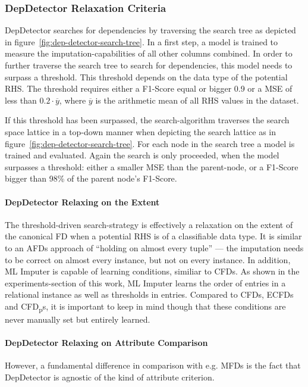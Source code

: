 \subsubsection{DepDetector Relaxation Criteria}
DepDetector searches for dependencies by traversing the search tree as depicted in figure~\ref{fig:dep-detector-search-tree}.
In a first step, a model is trained to measure the imputation-capabilities of all other columns combined.
In order to further traverse the search tree to search for dependencies, this model needs to surpass a threshold.
This threshold depends on the data type of the potential RHS.
The threshold requires either a F1-Score equal or bigger 0.9 or a MSE of less than \( 0.2 \cdot \overline{y} \), where \( \overline{y} \) is the arithmetic mean of all RHS values in the dataset.

If this threshold has been surpassed, the search-algorithm traverses the search space lattice in a top-down manner when depicting the search lattice as in figure~\ref{fig:dep-detector-search-tree}.
For each node in the search tree a model is trained and evaluated.
Again the search is only proceeded, when the model surpasses a threshold: either a smaller MSE than the parent-node, or a F1-Score bigger than 98\% of the parent node's F1-Score.

\paragraph{DepDetector Relaxing on the Extent}The threshold-driven search-strategy is effectively a relaxation on the extent of the canonical FD when a potential RHS is of a classifiable data type.
It is similar to an AFDs approach of ``holding on almost every tuple'' --- the imputation needs to be correct on almost every instance, but not on every instance.
In addition, ML Imputer is capable of learning conditions, similiar to CFDs.
As shown in the experiments-section of this work, ML Imputer learns the order of entries in a relational instance as well as thresholds in entries.
Compared to CFDs, ECFDs and CFD\textsubscript{p}s, it is important to keep in mind though that these conditions are never manually set but entirely learned.

\paragraph{DepDetector Relaxing on Attribute Comparison}
However, a fundamental difference in comparison with e.g. MFDs is the fact that DepDetector is agnostic of the kind of attribute criterion.


